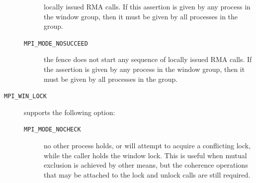 \begin{description}
\begin{description}
    locally issued RMA calls. If this assertion is given by any
    process in the window group, then it must be given by all
    processes in the group.
  \item[\texttt{MPI\_MODE\_NOSUCCEED}] the fence does not start any
    sequence of locally issued RMA calls. If the assertion is given by
    any process in the window group, then it must be given by all
    processes in the group.
  \end{description}
\item[\texttt{MPI\_WIN\_LOCK}] supports the following option:
  \begin{description}
    \item[\texttt{MPI\_MODE\_NOCHECK}] no other process holds, or will attempt to
    acquire a conflicting lock, while the caller holds the window
    lock. This is useful when mutual exclusion is achieved by other
    means, but the coherence operations that may be attached to the
    lock and unlock calls are still required.
  \end{description}
\end{description}

